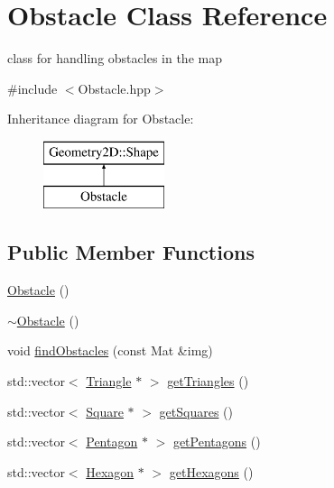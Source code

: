\hypertarget{class_obstacle}{}\section{Obstacle Class Reference}
\label{class_obstacle}


class for handling obstacles in the map  




{\ttfamily \#include $<$Obstacle.\+hpp$>$}

Inheritance diagram for Obstacle\+:\begin{figure}[H]
\begin{center}
\leavevmode
\includegraphics[height=2.000000cm]{class_obstacle}
\end{center}
\end{figure}
\subsection*{Public Member Functions}
\begin{DoxyCompactItemize}
\item 
\mbox{\hyperlink{class_obstacle_a8f734072321fa06a7b7dae2d5f50f352}{Obstacle}} ()
\item 
\mbox{\hyperlink{class_obstacle_af2f9cc9c6cff75dca0974fd5ac4f71a9}{$\sim$\+Obstacle}} ()
\item 
void \mbox{\hyperlink{class_obstacle_ae333b23b742b38e50be13bc7aec2da5b}{find\+Obstacles}} (const Mat \&img)
\item 
std\+::vector$<$ \mbox{\hyperlink{class_geometry2_d_1_1_triangle}{Triangle}} $\ast$ $>$ \mbox{\hyperlink{class_obstacle_ae4541d52e558b0995203e99d09d4d5d6}{get\+Triangles}} ()
\item 
std\+::vector$<$ \mbox{\hyperlink{class_geometry2_d_1_1_square}{Square}} $\ast$ $>$ \mbox{\hyperlink{class_obstacle_aa7d4a88d87f53bc8ba1e2b9123354f3c}{get\+Squares}} ()
\item 
std\+::vector$<$ \mbox{\hyperlink{class_geometry2_d_1_1_pentagon}{Pentagon}} $\ast$ $>$ \mbox{\hyperlink{class_obstacle_a7cbf1671e8fef324fe113517094f8428}{get\+Pentagons}} ()
\item 
std\+::vector$<$ \mbox{\hyperlink{class_geometry2_d_1_1_hexagon}{Hexagon}} $\ast$ $>$ \mbox{\hyperlink{class_obstacle_a26db0857f78a85a975957720eeb0464d}{get\+Hexagons}} ()
\end{DoxyCompactItemize}


